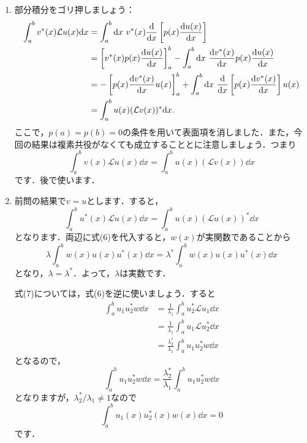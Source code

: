 \documentclass[a4paper,pdflatex,ja=standard]{bxjsarticle}
\begin{document}
\begin{enumerate}
  \item 

  部分積分をゴリ押しましょう：
  \begin{align}
    \int_{a}^{b}
    v^{*}(x)\mathcal{L}u(x)    
    \dd x
    &=
    \int_{a}^{b}
    \dd x\ 
    v^{*}(x)\dv{}{x}\left[ p(x)\dv{u(x)}{x} \right] 
    \nonumber
    \\
    &=
    \left[  
      v^{*}(x)p(x)\dv{u(x)}{x}
    \right]_{a}^{b}
    -
    \int_{a}^{b}
    \dd x\ 
    \dv{v^{*}(x)}{x}p(x)\dv{u(x)}{x}
    \nonumber
    \\
    &=
    -
    \left[  
      p(x)\dv{v^{*}(x)}{x}u(x)
    \right]_{a}^{b}
    +
    \int_{a}^{b}
    \dd x\ 
    \dv{}{x}\left[  
      p(x)\dv{v^{*}(x)}{x}
    \right]u(x)
    \nonumber
    \\
    &=
    \int_{a}^{b}
    u(x)(\mathcal{L}v(x))^{*}
    \dd x
    .
  \end{align}
  ここで，$p(a)=p(b)=0$の条件を用いて表面項を消しました．また，今回の結果は複素共役がなくても成立することとに注意しましょう．つまり
  \begin{equation}
    \int_{a}^{b}
    v(x)\mathcal{L}u(x)
    \dd x
    =
    \int_{a}^{b}
    u(x)(\mathcal{L}v(x))
    \dd x
    \label{uv_rel}
  \end{equation}
  です．後で使います．


  \item 

  前問の結果で$v=u$とします．すると，
  \begin{equation}
    \int_{a}^{b}
    u^{*}(x)\mathcal{L}u(x)\dd x
    =
    \int_{a}^{b}
    u(x)(\mathcal{L}u(x))^{*}\dd x
  \end{equation}
  となります．両辺に式(6)を代入すると，$w(x)$が実関数であることから
  \begin{equation}
    \lambda
    \int_{a}^{b}w(x)u(x)u^{*}(x)\dd x
    =
    \lambda^{*}
    \int_{a}^{b}w(x)u(x)u^{*}(x)\dd x
  \end{equation}
  となり，$\lambda=\lambda^{*}$．よって，$\lambda$は実数です．

  式(7)については，式(6)を逆に使いましょう．すると
  \begin{align}
    \int_{a}^{b}
    u_1u_2^{*}w
    \dd x
    &=
    \frac{1}{\lambda_1}
    \int_a^b
    u_2^* \mathcal{L}u_1
    \dd x
    \nonumber
    \\
    &=
    \frac{1}{\lambda_1}
    \int_a^b
    u_1\mathcal{L}u_2^*
    \dd x
    \nonumber
    \\
    &=
    \frac{\lambda_2^*}{\lambda_1}
    \int_a^b
    u_1u_2^*w
    \dd x
  \end{align}
  となるので，
  \begin{equation}
    \int_a^b
    u_1u_2^*w
    \dd x
    =    
    \frac{\lambda_2^*}{\lambda_1}
    \int_a^b
    u_1u_2^*w
    \dd x
  \end{equation}
  となりますが，$\lambda_2^*/\lambda_1\neq 1$なので
  \begin{equation}    
    \int_a^b
    u_1(x)u_2^*(x)w(x)
    \dd x
    =
    0
  \end{equation}
  です．



\end{enumerate}
\end{document}
